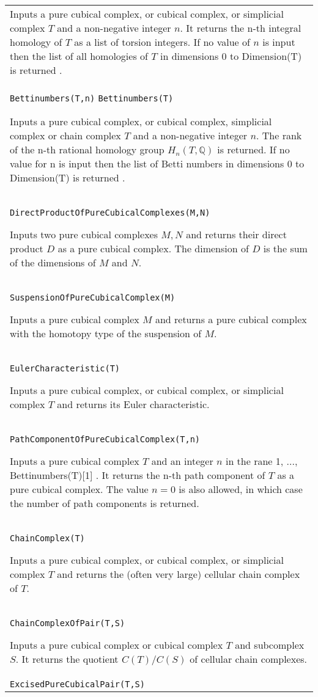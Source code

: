 \documentclass[a4paper,11pt]{report}
\begin{document}
{\begin{center}
\begin{tabular}{|l|}
 Inputs a pure cubical complex, or cubical complex, or simplicial complex $T$ and a non-negative integer $n$. It returns the n-th integral homology of $T$ as a list of torsion integers. If no value of $n$ is input then the list of all homologies of $T$ in dimensions 0 to Dimension(T) is returned . \\
 \index{Bettinumbers} \texttt{Bettinumbers(T,n)} \texttt{Bettinumbers(T)} 

 Inputs a pure cubical complex, or cubical complex, simplicial complex or chain
complex $T$ and a non-negative integer $n$. The rank of the n-th rational homology group $H_n(T,\mathbb Q)$ is returned. If no value for n is input then the list of Betti numbers in
dimensions 0 to Dimension(T) is returned . \\
 \index{DirectProductOfPureCubicalComplexes} \texttt{DirectProductOfPureCubicalComplexes(M,N)} 

 Inputs two pure cubical complexes $M,N$ and returns their direct product $D$ as a pure cubical complex. The dimension of $D$ is the sum of the dimensions of $M$ and $N$. \\
 \index{SuspensionOfPureCubicalComplex} \texttt{SuspensionOfPureCubicalComplex(M)} 

 Inputs a pure cubical complex $M$ and returns a pure cubical complex with the homotopy type of the suspension of $M$. \\
 \texttt{EulerCharacteristic(T)} 

 Inputs a pure cubical complex, or cubical complex, or simplicial complex $T$ and returns its Euler characteristic. \\
 \index{PathComponentOfPureCubicalComplex} \texttt{PathComponentOfPureCubicalComplex(T,n)} 

 Inputs a pure cubical complex $T$ and an integer $n$ in the rane 1, ..., Bettinumbers(T)[1] . It returns the n-th path component of $T$ as a pure cubical complex. The value $n=0$ is also allowed, in which case the number of path components is returned. \\
 \texttt{ChainComplex(T)} 

 Inputs a pure cubical complex, or cubical complex, or simplicial complex $T$ and returns the (often very large) cellular chain complex of $T$. \\
 \texttt{ChainComplexOfPair(T,S)} 

 Inputs a pure cubical complex or cubical complex $T$ and subcomplex $S$. It returns the quotient $C(T)/C(S)$ of cellular chain complexes. \\
 \texttt{ExcisedPureCubicalPair(T,S)} 


\end{tabular}
\end{center}}
\end{document}
